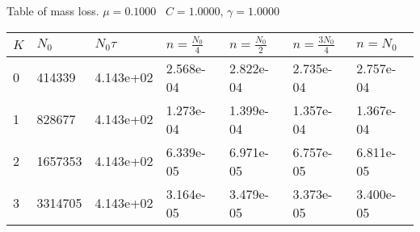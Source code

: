 \begin{center}
Table of mass loss. $\mu = 0.1000$ \, $C = 1.0000$, $\gamma = 1.0000$
  
\begin{tabular}{|p{0.8in}|p{0.8in}|p{0.8in}|p{0.8in}|p{0.8in}|p{0.8in}|p{0.8in}|} \hline
$K$ &$N_0$ &$N_0 \tau$ &$n = \frac{N_0}{4}$ &$n = \frac{N_0}{2}$ &$n = \frac{3N_0}{4}$ &$n = N_0$ \\ \hline 
0 &414339 &4.143e+02 &2.568e-04 &2.822e-04 &2.735e-04 &2.757e-04 \\ \hline 
1 &828677 &4.143e+02 &1.273e-04 &1.399e-04 &1.357e-04 &1.367e-04 \\ \hline 
2 &1657353 &4.143e+02 &6.339e-05 &6.971e-05 &6.757e-05 &6.811e-05 \\ \hline 
3 &3314705 &4.143e+02 &3.164e-05 &3.479e-05 &3.373e-05 &3.400e-05 \\ \hline 

\end{tabular}\\[20pt]
\end{center}
